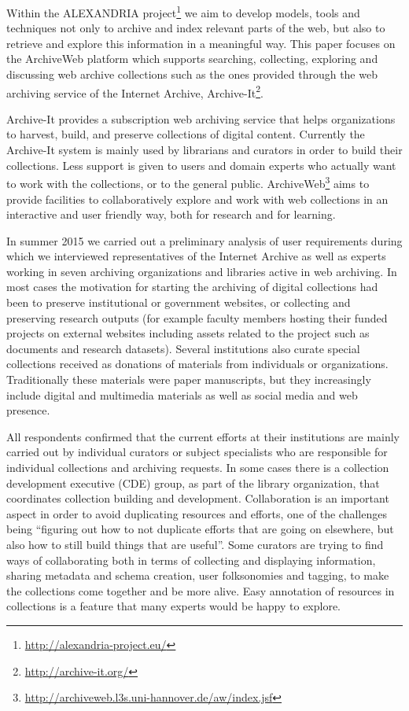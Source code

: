 \documentclass{llncs}
\begin{document}
Within the ALEXANDRIA
project\footnote{\url{http://alexandria-project.eu/}} we aim to
develop models, tools and techniques not only to archive and index
relevant parts of the web, but also to retrieve and explore this
information in a meaningful way. This paper focuses on the ArchiveWeb
platform which supports searching, collecting, exploring and
discussing web archive collections such as the ones provided through the web
archiving service of the Internet Archive,
Archive-It\footnote{\url{http://archive-it.org/}}.

Archive-It provides a subscription web archiving service that helps
organizations to harvest, build, and preserve collections of digital
content. Currently the Archive-It system is mainly used by librarians
and curators in order to build their collections. Less support is
given to users and domain experts who actually want to work with
the collections, or to the general public. 
ArchiveWeb\footnote{\url{http://archiveweb.l3s.uni-hannover.de/aw/index.jsf}} aims to provide facilities to collaboratively explore
and work with web collections in an interactive and user friendly
way, both for research and for learning.

In summer 2015 we carried out a preliminary analysis of user
requirements during which we interviewed representatives of the
Internet Archive as well as experts working in seven archiving
organizations and libraries active in web archiving. In most cases the
motivation for starting the archiving of digital collections had been
to preserve institutional or government websites, or collecting and
preserving research outputs (for example faculty members hosting their
funded projects on external websites including assets related to the
project such as documents and research datasets). Several institutions
also curate special collections received as donations of materials
from individuals or organizations. Traditionally these materials were
paper manuscripts, but they increasingly include digital and
multimedia materials as well as social media and web presence.

All respondents confirmed that the current efforts at their
institutions are mainly carried out by individual curators or subject
specialists who are responsible for individual collections and
archiving requests. In some cases there is a collection development
executive (CDE) group, as part of the library organization, that
coordinates collection building and development.  Collaboration is an
important aspect in order to avoid duplicating resources and efforts,
one of the challenges being ``figuring out how to not duplicate
efforts that are going on elsewhere, but also how to still build
things that are useful''. Some curators are trying to find ways of
collaborating both in terms of collecting and displaying information,
sharing metadata and schema creation, user folksonomies and tagging,
to make the collections come together and be more alive. Easy annotation
of resources in collections is a feature that many experts would be
happy to explore.
\end{document}
